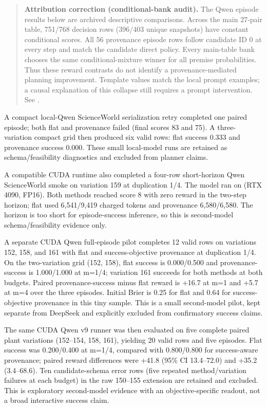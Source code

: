 \documentclass[10pt]{article}
\begin{document}
\begin{quote}
\textbf{Attribution correction (conditional-bank audit).} The Qwen episode results below are archived descriptive comparisons. Across the main 27-pair table, 751/768 decision rows (396/403 unique snapshots) have constant conditional scores. All 56 provenance episode rows follow candidate ID 0 at every step and match the candidate direct policy. Every main-table bank chooses the same conditional-mixture winner for all premise probabilities. Thus these reward contrasts do not identify a provenance-mediated planning improvement. Template values match the local prompt examples; a causal explanation of this collapse still requires a prompt intervention. See \texttt{}.
\end{quote}

A compact local-Qwen ScienceWorld serialization retry completed one paired \texttt{} episode; both flat and provenance failed (final scores 83 and 75). A three-variation compact grid then produced six valid rows: flat success 0.333 and provenance success 0.000. These small local-model runs are retained as schema/feasibility diagnostics and excluded from planner claims.

A compatible CUDA runtime also completed a four-row short-horizon Qwen ScienceWorld smoke on \texttt{} variation 159 at duplication 1/4. The model ran on \texttt{} (RTX 4090, FP16). Both methods reached score 8 with zero reward in the two-step horizon; flat used 6,541/9,419 charged tokens and provenance 6,580/6,580. The horizon is too short for episode-success inference, so this is second-model schema/feasibility evidence only.

A separate CUDA Qwen full-episode pilot completes 12 valid rows on \texttt{} variations 152, 158, and 161 with flat and success-objective provenance at duplication 1/4. On the two-variation grid (152, 158), flat success is 0.000/0.500 and provenance-success is 1.000/1.000 at m=1/4; variation 161 succeeds for both methods at both budgets. Paired provenance-success minus flat reward is +16.7 at m=1 and +5.7 at m=4 over the three episodes. Initial Brier is 0.25 for flat and 0.64 for success-objective provenance in this tiny sample. This is a small second-model pilot, kept separate from DeepSeek and explicitly excluded from confirmatory success claims.

The same CUDA Qwen v9 runner was then evaluated on five complete paired plant variations (152--154, 158, 161), yielding 20 valid rows and five episodes. Flat success was 0.200/0.400 at m=1/4, compared with 0.800/0.800 for success-aware provenance; paired reward differences were +41.8 (95\% CI 13.4--72.0) and +35.2 (3.4--68.6). Ten candidate-schema error rows (five repeated method/variation failures at each budget) in the raw 150--155 extension are retained and excluded. This is exploratory second-model evidence with an objective-specific readout, not a broad interactive success claim.
\end{document}
